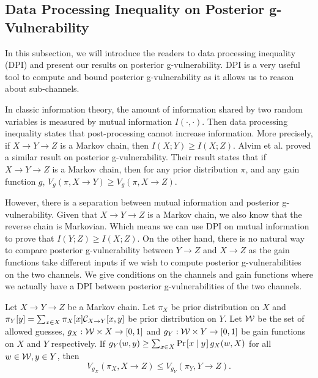 \subsection{Data Processing Inequality on Posterior g-Vulnerability}
In this subsection, we will introduce the readers to data processing inequality (DPI) and present our results on posterior g-vulnerability. DPI is a very useful tool to compute and bound posterior g-vulnerability as it allows us to reason about sub-channels.

In classic information theory, the amount of information shared by two random variables is measured by mutual information $I(\cdot, \cdot)$. Then data processing inequality states that post-processing cannot increase information. More precisely, if $X \rightarrow Y \rightarrow Z$ is a Markov chain, then $I(X;Y) \geq I(X;Z)$. Alvim et al. \cite{6266165} proved a similar result on posterior g-vulnerability. Their result states that if $X \rightarrow Y \rightarrow Z$ is a Markov chain, then for any prior distribution $\pi$, and any gain function $g$, $V_g(\pi, X \rightarrow Y) \geq V_g(\pi, X \rightarrow Z)$.

However, there is a separation between mutual information and posterior g-vulnerability. Given that $X \rightarrow Y \rightarrow Z$ is a Markov chain, we also know that the reverse chain is Markovian. Which means we can use DPI on mutual information to prove that $I(Y;Z) \geq I(X;Z)$. On the other hand, there is no natural way to compare posterior g-vulnerability between $Y \rightarrow Z$ and $X \rightarrow Z$ as the gain functions take different inputs if we wish to compute posterior g-vulnerabilities on the two channels. We give conditions on the channels and gain functions where we actually have a DPI between posterior g-vulnerabilities of the two channels.


\begin{theorem} \label{Theorem: our DPI, simple}
	\normalfont
	Let $X \rightarrow Y \rightarrow Z$ be a Markov chain. Let $\pi_X$ be prior distribution on $X$ and $\pi_Y[y] = \sum_{x \in X} \pi_X[x] \mathcal{C}_{X \rightarrow Y}[x,y]$ be prior distribution on $Y$. Let $\mathcal{W}$ be the set of allowed guesses, $g_{X}: \mathcal{W} \times X \rightarrow [0,1]$ and $g_{Y}: \mathcal{W} \times Y \rightarrow [0,1]$ be gain functions on $X$ and $Y$ respectively. If $g_{Y}(w, y) \geq \sum_{x \in X} \prob{x \mid y} g_{X}(w, X)$ for all $w \in \mathcal{W}, y \in Y$, then
	\begin{equation*}
		V_{g_{X}}(\pi_X, X \rightarrow Z) \leq V_{g_{Y}}(\pi_Y, Y \rightarrow Z).
	\end{equation*}
\end{theorem}



